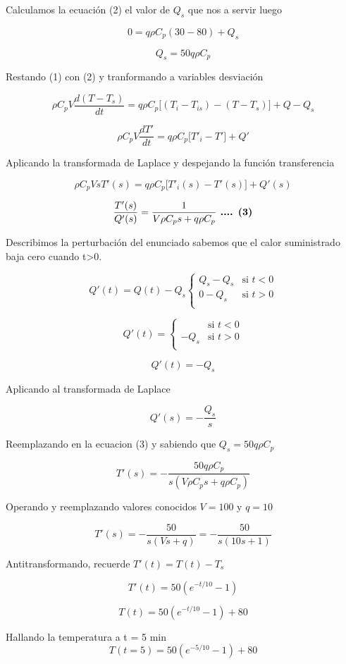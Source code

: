 \documentclass[
  letterpaper,
  DIV=11,
  numbers=noendperiod]{scrreprt}
\begin{document}
Calculamos la ecuación (2) el valor de \(Q_s\) que nos a servir luego

\[
0 = q \rho C_p(30-80)+Q_s
\]

\[
Q_s=50q\rho C_p
\]

Restando (1) con (2) y tranformando a variables desviación

\[
\rho C_p V \frac{d(T-T_s)}{dt}=q \rho C_p\big[(T_i-T_{is})-(T-T_s)\big]+Q-Q_s
\]

\[
\rho C_p V \frac{dT'}{dt}=q \rho C_p\big[T'_i-T'\big]+Q'
\]

Aplicando la transformada de Laplace y despejando la función
transferencia

\[
\rho C_p V sT'(s)=q \rho C_p\big[T'_i(s)-T'(s)\big]+Q'(s)
\]

\[
\frac{T'(s)}{Q'(s)}=\frac{1}{V\rho C_p s+q\rho C_p}\space\space\space\textbf{ .... (3)}
\]

Describimos la perturbación del enunciado sabemos que el calor
suministrado baja cero cuando t\textgreater0.

\[
Q'(t)= Q(t)-Q_s
\begin{cases}
   Q_s-Q_s &\text{si } t < 0 \\
   0 - Q_s &\text{si } t > 0\\
\end{cases}
\]

\[
Q'(t)=
\begin{cases}
   &\text{si } t < 0 \\
   - Q_s &\text{si } t > 0\\
\end{cases}
\]

\[
Q'(t) = -Q_s
\]

Aplicando al transformada de Laplace

\[
Q'(s)= -\frac{Q_s}{s}
\]

Reemplazando en la ecuacion (3) y sabiendo que \(Q_s=50q\rho C_p\)

\[
T'(s)=-\frac{50q\rho C_p}{s(V\rho C_p s+q\rho C_p)}
\]

Operando y reemplazando valores conocidos \(V=100\) y \(q=10\)

\[
T'(s)=-\frac{50}{s(Vs+q)}=-\frac{50}{s(10s+1)}
\]

Antitransformando, recuerde \(T'(t) = T(t)-T_s\)

\[
T'(t)=50(e^{-t/10}-1)
\]

\[
T(t)=50(e^{-t/10}-1)+80
\]

Hallando la temperatura a t = 5 min \[
T(t=5)=50(e^{-5/10}-1)+80
\]
\end{document}
